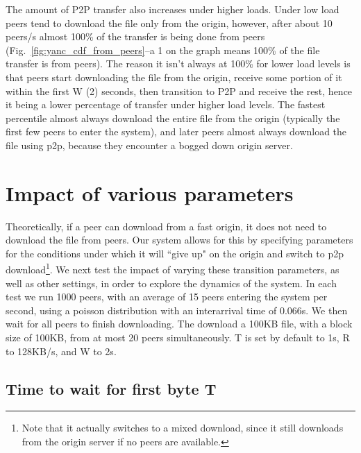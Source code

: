 The amount of P2P transfer also increases under higher loads.  Under low load peers tend to download the file only from the origin, however, after about 10 peers/s almost 100\% of the transfer is being done from peers (Fig.~\ref{fig:yanc_cdf_from_peers}--a 1 on the graph means 100\% of the file transfer is from peers).  The reason it isn't always at 100\% for lower load levels is that peers start downloading the file from the origin, receive some portion of it within the first W (2) seconds, then transition to P2P and receive the rest, hence it being a lower percentage of transfer under higher load levels.  The fastest percentile almost always download the entire file from the origin (typically the first few peers to enter the system), and later peers almost always download the file using p2p, because they encounter a bogged down origin server.

\section{Impact of various parameters}

Theoretically, if a peer can download from a fast origin,  it does not need to download the file from peers.  Our system allows for this by specifying parameters for the conditions under which it will ``give up" on the origin and switch to p2p download\footnote{Note that it actually switches to a mixed download, since it still downloads from the origin server if no peers are available.}.  We next test the impact of varying these transition parameters, as well as other settings, in order to explore the dynamics of the system.  In each test we run 1000 peers, with an average of 15 peers entering the system per second, using a poisson distribution with an interarrival time of 0.066s.  We then wait for all peers to finish downloading.  The download a 100KB file, with a block size of 100KB, from at most 20 peers simultaneously. T is set by default to 1s, R to 128KB/s, and W to 2s.

\subsection{Time to wait for first byte T}

